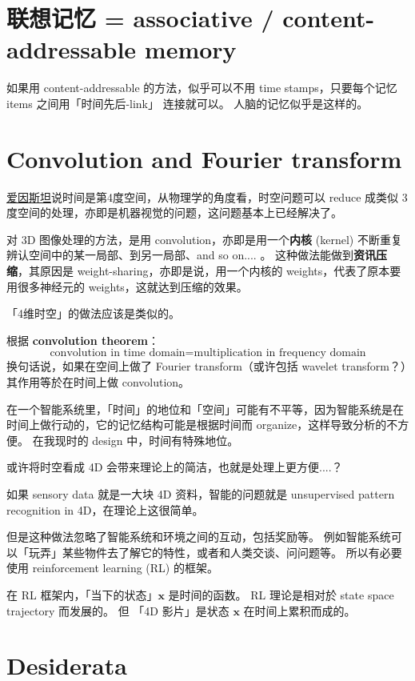 \documentclass[orivec]{llncs}
\newcommand{\emp}[1]{\textbf{\textcolor{Cerulean}{#1}}}
\newcommand{\vect}[1]{\boldsymbol{#1}}
\begin{document}
\section{联想记忆 = associative / content-addressable memory}

如果用 content-addressable 的方法，似乎可以不用 time stamps，只要每个记忆 items 之间用「时间先后-link」 连接就可以。 人脑的记忆似乎是这样的。

\section{Convolution and Fourier transform}

\uline{爱因斯坦}说时间是第4度空间，从物理学的角度看，时空问题可以 reduce 成类似 3 度空间的处理，亦即是机器视觉的问题，这问题基本上已经解决了。 

对 3D 图像处理的方法，是用 convolution，亦即是用一个\emp{内核} (kernel) 不断重复辨认空间中的某一局部、到另一局部、and so on.... 。  这种做法能做到\textbf{资讯压缩}，其原因是 weight-sharing，亦即是说，用一个内核的 weights，代表了原本要用很多神经元的 weights，这就达到压缩的效果。

「4维时空」的做法应该是类似的。

根据 \emp{convolution theorem}\cite{wikiConvolutionTheorem}：
\begin{equation}
\mbox{convolution in time domain} = \mbox{multiplication in frequency domain}
\end{equation}
换句话说，如果在空间上做了 Fourier transform（或许包括 wavelet transform？）其作用等於在时间上做 convolution。 

在一个智能系统里，「时间」的地位和「空间」可能有不平等，因为智能系统是在时间上做行动的，它的记忆结构可能是根据时间而 organize，这样导致分析的不方便。 在我现时的 design 中，时间有特殊地位。

或许将时空看成 4D 会带来理论上的简洁，也就是处理上更方便....？

如果 sensory data 就是一大块 4D 资料，智能的问题就是 unsupervised pattern recognition in 4D，在理论上这很简单。

但是这种做法忽略了智能系统和环境之间的互动，包括奖励等。 例如智能系统可以「玩弄」某些物件去了解它的特性，或者和人类交谈、问问题等。  所以有必要使用 reinforcement learning (RL) 的框架。

在 RL 框架内，「当下的状态」$\vect{x}$ 是时间的函数。 RL 理论是相对於 state space trajectory 而发展的。  但 「4D 影片」是状态 $\vect{x}$ 在时间上累积而成的。

\section{Desiderata}
\end{document}
